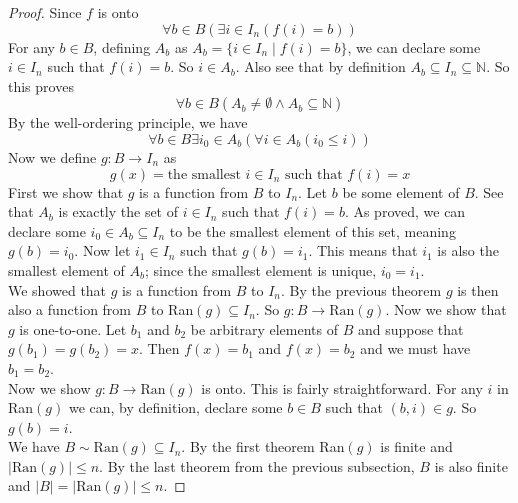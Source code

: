 \documentclass{report}
\theoremstyle{definition}
\begin{document}
\begin{proof}
Since $f$ is onto
\begin{equation*}
\forall b\in B(\exists i\in I_n(f(i)=b))
\end{equation*}
For any $b\in B$, defining $A_b$ as $A_b=\{i\in I_n\mid f(i)=b\}$, we can declare some $i\in I_n$ such that $f(i)=b$. So $i\in A_b$. 
Also see that by definition $A_b\subseteq I_n\subseteq\mathbb N$. So 
this proves
\begin{equation*}
\forall b\in B(A_b\neq\emptyset\land A_b\subseteq\mathbb N)
\end{equation*}
By the well-ordering principle, we have
\begin{equation*}
\forall b\in B\exists i_0\in A_b(\forall i\in A_b(i_0\leq i))
\end{equation*}
Now we define $g:B\to I_n$ as
\begin{equation*}
g(x)=\text{the smallest }i\in I_n\text{ such that }f(i)=x
\end{equation*}
First we show that $g$ is a function from $B$ to $I_n$. Let $b$ be some element of $B$. 
See that $A_b$ is exactly the set of $i\in I_n$ such that $f(i)=b$. As proved, we can declare some
$i_0\in A_b\subseteq I_n$ to be the smallest element of this set, meaning $g(b)=i_0$. 
Now let $i_1\in I_n$ such that $g(b)=i_1$. This means that $i_1$ is also the smallest element of $A_b$; since the smallest element is unique, $i_0=i_1$.\\
\indent We showed that $g$ is a function from $B$ to $I_n$. By the previous theorem $g$ is then also a function from $B$ to Ran$(g)\subseteq I_n$. So $g:B\to\text{Ran}(g)$. Now we show that $g$ is
one-to-one. Let $b_1$ and $b_2$ be arbitrary elements of $B$ and suppose that $g(b_1)=g(b_2)=x$.
Then $f(x)=b_1$ and $f(x)=b_2$ and we must have $b_1=b_2$.\\
\indent Now we show $g:B\to\text{Ran}(g)$ is onto. This is fairly straightforward. For any $i$ in Ran$(g)$ we can, by definition, declare some $b\in B$ such that $(b,i)\in g$. So $g(b)=i$.\\
\indent We have $B\sim\text{Ran}(g)\subseteq I_n$. By the first theorem Ran$(g)$ is finite and $|\text{Ran}(g)|\leq n$. By the last theorem from the previous subsection, $B$ is also finite and 
$|B|=|\text{Ran}(g)|\leq n$.
\end{proof}
\newpage
\end{document}

